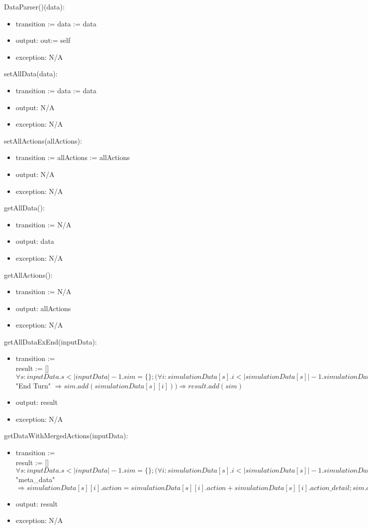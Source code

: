 \documentclass[12pt, titlepage]{article}
\begin{document}
\noindent DataParser()(data):
\begin{itemize}
\item transition := data := data
\item output: out:= self
\item exception: N/A
\end{itemize}

\noindent setAllData(data):
\begin{itemize}
\item transition := data := data
\item output: N/A
\item exception: N/A
\end{itemize}

\noindent setAllActions(allActions):
\begin{itemize}
\item transition := allActions := allActions
\item output: N/A
\item exception: N/A
\end{itemize}

\noindent getAllData():
\begin{itemize}
\item transition := N/A
\item output: data
\item exception: N/A
\end{itemize}

\noindent getAllActions():
\begin{itemize}
\item transition := N/A
\item output: allActions
\item exception: N/A
\end{itemize}

\noindent getAllDataExEnd(inputData):
\begin{itemize}
\item transition := \\
result := []\\
$\forall s: inputData. s < |inputData|-1. sim = \{\}; (\forall i: simulationData[s]. i < |simulationData[s]|-1. simulationData[s][i].action \neq$ "End Turn" $\Rightarrow sim.add(simulationData[s][i])) \Rightarrow result.add(sim)$
\item output: result
\item exception: N/A
\end{itemize}

\noindent getDataWithMergedActions(inputData):
\begin{itemize}
\item transition := \\
result := []\\
$\forall s: inputData. s < |inputData|-1. sim = \{\}; (\forall i: simulationData[s]. i < |simulationData[s]|-1. simulationData[s][i].action \neq$ "meta\_data" $\Rightarrow simulationData[s][i].action = simulationData[s][i].action + simulationData[s][i].action\_detail; sim.add(simulationData[s][i])) \Rightarrow result.add(sim)$
\item output: result
\item exception: N/A
\end{itemize}
\end{document}
